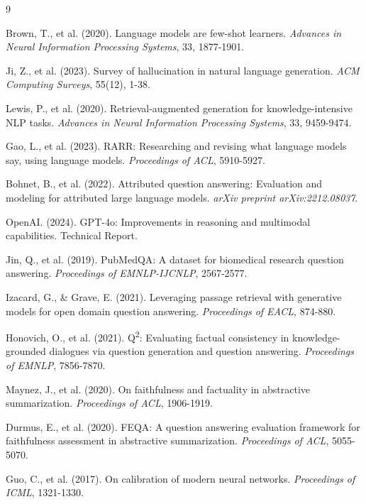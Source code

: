 \documentclass[11pt]{article}
\begin{document}
\begin{thebibliography}{9}

Brown, T., et al. (2020).
Language models are few-shot learners.
\textit{Advances in Neural Information Processing Systems}, 33, 1877-1901.

Ji, Z., et al. (2023).
Survey of hallucination in natural language generation.
\textit{ACM Computing Surveys}, 55(12), 1-38.

Lewis, P., et al. (2020).
Retrieval-augmented generation for knowledge-intensive NLP tasks.
\textit{Advances in Neural Information Processing Systems}, 33, 9459-9474.

Gao, L., et al. (2023).
RARR: Researching and revising what language models say, using language models.
\textit{Proceedings of ACL}, 5910-5927.

Bohnet, B., et al. (2022).
Attributed question answering: Evaluation and modeling for attributed large language models.
\textit{arXiv preprint arXiv:2212.08037}.

OpenAI. (2024).
GPT-4o: Improvements in reasoning and multimodal capabilities.
Technical Report.

Jin, Q., et al. (2019).
PubMedQA: A dataset for biomedical research question answering.
\textit{Proceedings of EMNLP-IJCNLP}, 2567-2577.

Izacard, G., \& Grave, E. (2021).
Leveraging passage retrieval with generative models for open domain question answering.
\textit{Proceedings of EACL}, 874-880.

Honovich, O., et al. (2021).
Q\textsuperscript{2}: Evaluating factual consistency in knowledge-grounded dialogues via question generation and question answering.
\textit{Proceedings of EMNLP}, 7856-7870.

Maynez, J., et al. (2020).
On faithfulness and factuality in abstractive summarization.
\textit{Proceedings of ACL}, 1906-1919.

Durmus, E., et al. (2020).
FEQA: A question answering evaluation framework for faithfulness assessment in abstractive summarization.
\textit{Proceedings of ACL}, 5055-5070.

Guo, C., et al. (2017).
On calibration of modern neural networks.
\textit{Proceedings of ICML}, 1321-1330.

\end{thebibliography}
\end{document}
